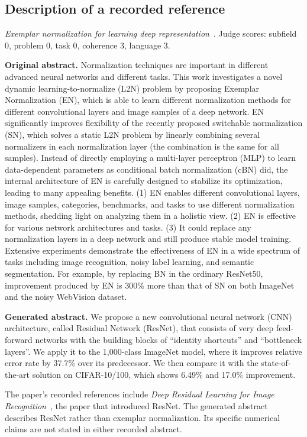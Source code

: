 \subsection{Description of a recorded reference}
\textit{Exemplar normalization for learning deep representation}~\cite{zhang2020exemplar}. Judge scores: subfield 0, problem 0, task 0, coherence 3, language 3.\nopagebreak[4]

\textbf{Original abstract.} Normalization techniques are important in different advanced neural networks and different tasks. This work investigates a novel dynamic learning-to-normalize (L2N) problem by proposing Exemplar Normalization (EN), which is able to learn different normalization methods for different convolutional layers and image samples of a deep network. EN significantly improves flexibility of the recently proposed switchable normalization (SN), which solves a static L2N problem by linearly combining several normalizers in each normalization layer (the combination is the same for all samples). Instead of directly employing a multi-layer perceptron (MLP) to learn data-dependent parameters as conditional batch normalization (cBN) did, the internal architecture of EN is carefully designed to stabilize its optimization, leading to many appealing benefits. (1) EN enables different convolutional layers, image samples, categories, benchmarks, and tasks to use different normalization methods, shedding light on analyzing them in a holistic view. (2) EN is effective for various network architectures and tasks. (3) It could replace any normalization layers in a deep network and still produce stable model training. Extensive experiments demonstrate the effectiveness of EN in a wide spectrum of tasks including image recognition, noisy label learning, and semantic segmentation. For example, by replacing BN in the ordinary ResNet50, improvement produced by EN is 300\% more than that of SN on both ImageNet and the noisy WebVision dataset.

\textbf{Generated abstract.} We propose a new convolutional neural network (CNN) architecture, called Residual Network (ResNet), that consists of very deep feed-forward networks with the building blocks of ``identity shortcuts'' and ``bottleneck layers''. We apply it to the 1,000-class ImageNet model, where it improves relative error rate by 37.7\% over its predecessor. We then compare it with the state-of-the-art solution on CIFAR-10/100, which shows 6.49\% and 17.0\% improvement.

The paper's recorded references include \textit{Deep Residual Learning for Image Recognition}~\cite{he2016resnet}, the paper that introduced ResNet. The generated abstract describes ResNet rather than exemplar normalization. Its specific numerical claims are not stated in either recorded abstract.


